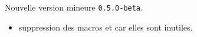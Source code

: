 Nouvelle version mineure \verb+0.5.0-beta+.

\begin{itemize}[itemsep=.5em]
    \item {}
          suppression des macros  et  car elles sont inutiles.


\end{itemize}

\separation

